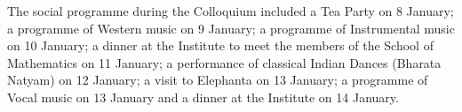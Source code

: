 The social programme during the Colloquium included a Tea Party on 8 January; a programme of Western music on 9 January; a programme of Instrumental music on 10 January; a dinner at the Institute to meet the members of the School of Mathematics on 11 January; a performance of classical Indian Dances (Bharata Natyam) on 12 January; a visit to Elephanta on 13 January; a programme of Vocal music on 13 January and a dinner at the Institute on 14 January.





